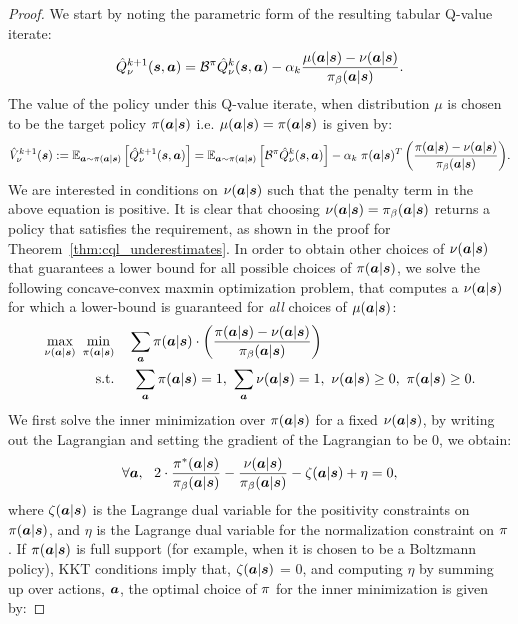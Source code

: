 \begin{proof}
We start by noting the parametric form of the resulting tabular Q-value iterate:
\begin{equation}
    \hat{Q}^{k+1}_\nu(\boldsymbol{s}, \boldsymbol{a}) = \mathcal{B}^\pi \hat{Q}^{k}_\nu(\boldsymbol{s}, \boldsymbol{a}) - \alpha_k \frac{\mu(\boldsymbol{a}|\boldsymbol{s}) - \nu(\boldsymbol{a}|\boldsymbol{s})}{{\pi_\beta}(\boldsymbol{a}|\boldsymbol{s})}.
    \label{eqn:q_value_nu}
\end{equation}
The value of the policy under this Q-value iterate, when distribution $\mu$ is chosen to be the target policy $\pi(\boldsymbol{a}|\boldsymbol{s})$ i.e. $\mu(\boldsymbol{a}|\boldsymbol{s}) = \pi(\boldsymbol{a}|\boldsymbol{s})$ is given by:
\begin{equation}
    \small{\hat{V}^{k+1}_\nu(\boldsymbol{s}): = \mathbb{E}_{\boldsymbol{a}\sim \pi(\boldsymbol{a}|\boldsymbol{s})}\left[\hat{Q}^{k+1}_\nu(\boldsymbol{s}, \boldsymbol{a})\right] = \mathbb{E}_{\boldsymbol{a}\sim \pi(\boldsymbol{a}|\boldsymbol{s})}\left[\mathcal{B}^\pi\hat{Q}^k_\nu(\boldsymbol{s}, \boldsymbol{a}) \right] - \alpha_k~ \pi(\boldsymbol{a}|\boldsymbol{s})^T \left(\frac{\pi(\boldsymbol{a}|\boldsymbol{s}) - \nu(\boldsymbol{a}|\boldsymbol{s})}{{\pi_\beta}(\boldsymbol{a}|\boldsymbol{s})}\right)}. 
\end{equation}
We are interested in conditions on $\nu(\boldsymbol{a}|\boldsymbol{s})$ such that the penalty term in the above equation is positive. It is clear that choosing $\nu(\boldsymbol{a}|\boldsymbol{s}) = {\pi_\beta}(\boldsymbol{a}|\boldsymbol{s})$ returns a policy that satisfies the requirement, as shown in the proof for Theorem~\ref{thm:cql_underestimates}. In order to obtain other choices of $\nu(\boldsymbol{a}|\boldsymbol{s})$ that guarantees a lower bound for all possible choices of $\pi(\boldsymbol{a}|\boldsymbol{s})$, we solve the following concave-convex maxmin optimization problem, that computes a $\nu(\boldsymbol{a}|\boldsymbol{s})$ for which a lower-bound is guaranteed for \textit{all} choices of $\mu(\boldsymbol{a}|\boldsymbol{s})$:
\begin{align*}
    \max_{\nu(\boldsymbol{a}|\boldsymbol{s})} ~\min_{\pi(\boldsymbol{a}|\boldsymbol{s})}~~& ~\sum_{\boldsymbol{a}} \pi(\boldsymbol{a}|\boldsymbol{s}) \cdot \left(\frac{\pi(\boldsymbol{a}|\boldsymbol{s}) - \nu(\boldsymbol{a}|\boldsymbol{s})}{{\pi_\beta}(\boldsymbol{a}|\boldsymbol{s})}\right)\\
    \text{s.t.}~~& ~~ \sum_{\boldsymbol{a}} \pi(\boldsymbol{a}|\boldsymbol{s}) = 1,~ \sum_{\boldsymbol{a}} \nu(\boldsymbol{a}|\boldsymbol{s}) = 1,~ \nu(\boldsymbol{a}|\boldsymbol{s}) \geq 0,~ \pi(\boldsymbol{a}|\boldsymbol{s}) \geq 0. 
\end{align*}
We first solve the inner minimization over $\pi(\boldsymbol{a}|\boldsymbol{s})$ for a fixed $\nu(\boldsymbol{a}|\boldsymbol{s})$, by writing
out the Lagrangian and setting the gradient of the Lagrangian to be 0, we obtain:
\begin{equation*}
    \forall \boldsymbol{a}, ~~ 2 \cdot \frac{\pi^*(\boldsymbol{a}|\boldsymbol{s})}{{\pi_\beta}(\boldsymbol{a}|\boldsymbol{s})} - \frac{\nu(\boldsymbol{a}|\boldsymbol{s})}{{\pi_\beta}(\boldsymbol{a}|\boldsymbol{s})} - \zeta(\boldsymbol{a}|\boldsymbol{s}) + \eta = 0, 
\end{equation*}
where $\zeta(\boldsymbol{a}|\boldsymbol{s})$ is the Lagrange dual variable for the positivity constraints on $\pi(\boldsymbol{a}|\boldsymbol{s})$, and $\eta$ is the Lagrange dual variable for the normalization constraint on $\pi$. If $\pi(\boldsymbol{a}|\boldsymbol{s})$ is full support (for example, when it is chosen to be a Boltzmann policy), KKT conditions imply that, $\zeta(\boldsymbol{a}|\boldsymbol{s})$ = 0, and computing $\eta$ by summing up over actions, $\boldsymbol{a}$, the optimal choice of $\pi$ for the inner minimization is given by:

\end{proof}
